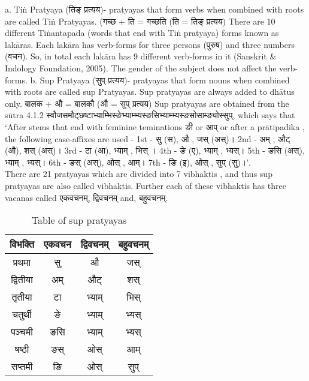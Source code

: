 a. Tiṅ Pratyaya (\texthindi{तिङ् प्रत्यय})- pratyayas that form verbs when combined with roots are called Tiṅ Pratyayas. 
(\texthindi{गच्छ} + \texthindi{ति} = \texthindi{गच्छति} (\texthindi{ति} = \texthindi{तिङ् प्रत्यय})
There are 10 different Tiṅantapada (words that end with Tiṅ pratyaya) forms known as lakāras. Each lakāra has verb-forms for three persons (\texthindi{पुरुष}) and three numbers (\texthindi{वचन}). So, in total each lakāra has 9 different verb-forms in it (Sanskrit \& Indology Foundation, 2005). The gender of the subject does not affect the verb-forms.
b.	Sup Pratyaya (\texthindi{सुप् प्रत्यय})- pratyayas that form nouns when combined with roots are called sup Pratyayas. Sup pratyayas are always added to dhātus only.
\texthindi{बालक} + \texthindi{औ } = \texthindi{बालकौ} (\texthindi{औ } =  \texthindi{सुप् प्रत्यय})
Sup pratyayas are obtained from the sūtra 4.1.2 \texthindi{स्वौजसमौट्छष्टाभ्याम्भिस्ङेभ्याम्भ्यस्ङसिभ्याम्भ्यस्ङसोसाम्ङ्योस्सुप्},  which says that ‘After stems that end with feminine teminations \texthindi{ङी} or \texthindi{आप् } or after a  prātipadika , the following case-affixes are used - 1st - \texthindi{सु (स), औ , जस् (अस्)।}  2nd -\texthindi{ अम् , औट् (औ), शस् (अस्)।} 3rd - \texthindi{टा (आ), भ्याम् , भिस् ।} 4th   - \texthindi{ ङे (ए), भ्याम् , भ्यस्।} 5th -\texthindi{ ङसि (अस्), भ्याम् , भ्यस्।} 6th - \texthindi{ङस् (अस्), ओस् , आम्। } 7th  - \texthindi{ ङि (इ), ओस् , सुप् (सु)।’}.\\
There are 21 pratyayas which are divided into 7 vibhaktis , and thus sup pratyayas are also called vibhaktis. Further each of these vibhaktis has three vacanas called \texthindi{एकवचनम्, द्विवचनम्} and, \texthindi{बहुवचनम्}.

\begin{table}[h!]
\begin{center}
\begin{tabular}{ |c|c|c|c| } 
 \hline
\texthindi{विभक्ति} &	\texthindi{एकवचन}	&\texthindi{द्विवचनम्}&	\texthindi{बहुवचनम्} \\ 
\hline
\texthindi{प्रथमा}
&	\texthindi{सु}	&\texthindi{औ}&	\texthindi{जस्} \\
\texthindi{द्वितीया} &	
\texthindi{अम्}	&\texthindi{औट्}&	\texthindi{शस्} 
\\\texthindi{तृतीया}&	\texthindi{टा}	&\texthindi{भ्याम्}&	\texthindi{भिस्} \\\texthindi{चतुर्थी}&	\texthindi{ङे}	&\texthindi{भ्याम्}&	\texthindi{भ्यस्} \\\texthindi{पञ्चमी}&	
\texthindi{ङसि}	&\texthindi{भ्याम्}&	\texthindi{भ्यस्} \\\texthindi{षष्ठी}& \texthindi{ङस्}	&\texthindi{ओस्}&	\texthindi{आम्} 
\\\texthindi{सप्तमी}&	\texthindi{ङि}	&\texthindi{ओस्}&	\texthindi{सुप्}\\  \hline
\end{tabular}
\caption{Table of sup pratyayas}
\label{table:3.1}
\end{center}
\end{table}

